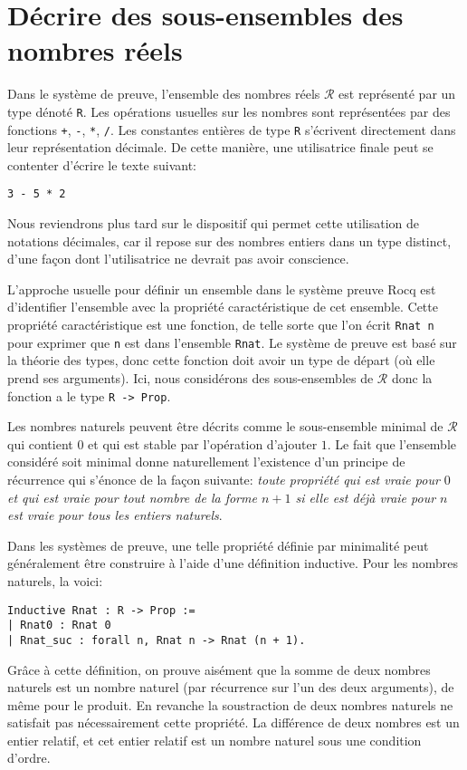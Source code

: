 \documentclass[draft]{jflart}
\begin{document}
\section{Décrire des sous-ensembles des nombres réels}
Dans le système de preuve, l'ensemble des nombres réels \(\mathcal R\)
est représenté par un type dénoté \texttt{R}.  Les opérations usuelles
sur les nombres sont représentées par des fonctions \texttt{+}, \texttt{-},
\texttt{*}, \texttt{/}.  Les constantes entières de type \texttt{R} s'écrivent
directement dans leur représentation décimale.  De cette manière, une
utilisatrice finale peut se contenter d'écrire le texte suivant:
\begin{verbatim}
3 - 5 * 2
\end{verbatim}
Nous reviendrons plus tard sur le dispositif qui permet cette
utilisation de notations décimales, car il repose sur des nombres
entiers dans un type distinct, d'une façon dont l'utilisatrice ne
devrait pas avoir conscience.

L'approche usuelle pour définir un ensemble dans le système preuve
Rocq est d'identifier l'ensemble avec la propriété caractéristique de
cet ensemble.  Cette propriété caractéristique est une fonction, de
telle sorte que l'on écrit \texttt{Rnat n} pour exprimer que \texttt{n} est
dans l'ensemble \texttt{Rnat}.  Le système de preuve est basé sur la
théorie des types, donc cette fonction doit avoir un type de départ
(où elle prend ses arguments).  Ici, nous considérons des
sous-ensembles de \(\mathcal R\) donc la fonction a le type \texttt{R ->
  Prop}.

Les nombres naturels peuvent être décrits comme le sous-ensemble
minimal de \(\mathcal R\) qui contient \(0\) et qui est stable par
l'opération d'ajouter \(1\).  Le fait que l'ensemble considéré soit
minimal donne naturellement l'existence d'un principe de récurrence
qui s'énonce de la façon suivante: {\em toute propriété qui est vraie
  pour \(0\) et qui est vraie pour tout nombre de la forme \(n + 1\)
  si elle est déjà vraie pour \(n\) est vraie pour tous les entiers
  naturels}.

Dans les systèmes de preuve, une telle propriété définie par minimalité
peut généralement être construire à l'aide d'une définition inductive.
Pour les nombres naturels, la voici:
\begin{verbatim}
Inductive Rnat : R -> Prop :=
| Rnat0 : Rnat 0
| Rnat_suc : forall n, Rnat n -> Rnat (n + 1).
\end{verbatim}

Grâce à cette définition, on prouve aisément que la somme de deux
nombres naturels est un nombre naturel (par récurrence sur l'un des
deux arguments), de même pour le produit.  En revanche la soustraction
de deux nombres naturels ne satisfait pas nécessairement cette
propriété.  La différence de deux nombres est un entier relatif, et
cet entier relatif est un nombre naturel sous une condition d'ordre.
\end{document}
